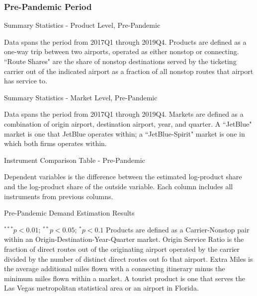 \documentclass{article}
\begin{document}
\begin{appendices}
	
	\FloatBarrier
	
	\subsubsection{Pre-Pandemic Period}
	
	\begin{table}
		\caption{Summary Statistics - Product Level, Pre-Pandemic}
		\label{tab:SummaryStatistics_Products_Pre}
		
		\footnotesize{Data spans the period from 2017Q1 through 2019Q4. Products are defined as a one-way trip between two airports, operated as either nonstop or connecting. ``Route Shares" are the share of nonstop destinations served by the ticketing carrier out of the indicated airport as a fraction of all nonstop routes that airport has service to.}
	\end{table}
	
	\begin{table}
		\caption{Summary Statistics - Market Level, Pre-Pandemic}
		\label{tab:SummaryStatistics_Market_Pre}
		
		\footnotesize{Data spans the period from 2017Q1 through 2019Q4. Markets are defined as a combination of origin airport, destination airport, year, and quarter. A ``JetBlue" market is one that JetBlue operates within; a ``JetBlue-Spirit" market is one in which both firms operates within. }
	\end{table}
	
	\begin{landscape}
		\begin{table}
			\caption{Instrument Comparison Table - Pre-Pandemic}
			\label{tab:Instrument_Compare_Pre}
			
			\footnotesize{Dependent variables is the difference between the estimated log-product share and the log-product share of the outside variable. Each column includes all instruments from previous columns.}
		\end{table}
	\end{landscape}
	
	
	\begin{table}
		\caption{Pre-Pandemic Demand Estimation Results}
		\label{tab:Results_PrePandemic}
		
		\footnotesize{$^{***}p<0.01$; $^{**}p<0.05$; $^{*}p<0.1$ Products are defined as a Carrier-Nonstop pair within an Origin-Destination-Year-Quarter market. Origin Service Ratio is the fraction of direct routes out of the originating airport operated by the carrier divided by the number of distinct direct routes out fo that airport. Extra Miles is the average additional miles flown with a connecting itinerary minus the minimum miles flown within a market.  A tourist product is one that serves the Las Vegas metropolitan statistical area or an airport in Florida.}
	\end{table}
	

\end{appendices}
\end{document}
